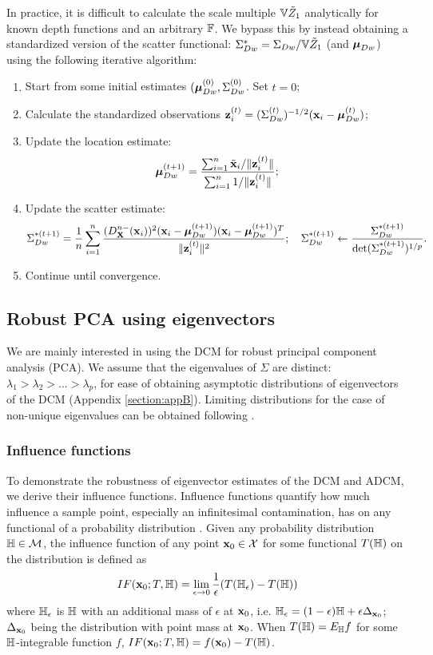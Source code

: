 In practice, it is difficult to calculate the scale multiple ${\mathbb{V}} \tilde Z_1$ analytically for known depth functions and an arbitrary ${\mathbb{F}}$. We bypass this by instead obtaining a standardized version of the scatter functional: $\Sigma_{Dw}^* = \Sigma_{Dw} / {\mathbb{V}} \tilde Z_1$ (and ${\boldsymbol{\mu}}_{Dw}$) using the following iterative algorithm:

\begin{enumerate}
\item Start from some initial estimates $({\boldsymbol{\mu}}_{Dw}^{(0)}, \Sigma_{Dw}^{(0)}$. Set $t=0$;

\item Calculate the standardized observations ${\bf{z}}_i^{(t)} = (\Sigma_{Dw}^{(t)})^{-1/2} ({\bf{x}}_i - {\boldsymbol{\mu}}_{Dw}^{(t)})$;

\item Update the location estimate:
%
$$
{\boldsymbol{\mu}}_{Dw}^{(t+1)} = \frac{\sum_{i=1}^n \tilde {{\bf{x}}}_i / \| {\bf{z}}_i^{(t)} \| }{\sum_{i=1}^n 1 / \| {\bf{z}}_i^{(t)} \|};
$$
%
\item Update the scatter estimate:
%
$$
\Sigma_{Dw}^{*(t+1)} = \frac{1}{n} \sum_{i=1}^n \frac{(D^{n-}_{\mathbf{X}} ({\bf{x}}_i))^2 ({\bf{x}}_i - {\boldsymbol{\mu}}_{Dw}^{(t+1)})({\bf{x}}_i - {\boldsymbol{\mu}}_{Dw}^{(t+1)})^T}{\| {\bf{z}}_i^{(t)} \|^2}; \quad \Sigma_{Dw}^{*(t+1)} \leftarrow \frac{\Sigma_{Dw}^{*(t+1)}}{\text{det} (\Sigma_{Dw}^{*(t+1)})^{1/p}}.
$$
%
\item Continue until convergence.
\end{enumerate}

\subsection{Robust PCA using eigenvectors}
\label{subsec:robustPCA}
We are mainly interested in using the DCM for robust principal component analysis (PCA). We assume that the eigenvalues of $\Sigma$ are distinct: $\lambda_1 > \lambda_2 > ... > \lambda_p$, for ease of obtaining asymptotic distributions of eigenvectors of the DCM (Appendix \ref{section:appB}). Limiting distributions for the case of non-unique eigenvalues can be obtained following \cite{magyar14}.

\subsubsection{Influence functions}
To demonstrate the robustness of eigenvector estimates of the DCM and ADCM, we derive their influence functions. Influence functions quantify how much influence a sample point, especially an infinitesimal contamination, has on any functional of a probability distribution \citep{HampelBook86}. Given any probability distribution ${\mathbb{H}} \in \mathcal{M}$, the influence function of any point ${\bf{x}}_0 \in \mathcal{X}$ for some functional $T({\mathbb{H}})$ on the distribution is defined as
%
$$
IF({\bf{x}}_0; T,{\mathbb{H}}) =
\lim_{\epsilon \rightarrow 0} \frac{1}{\epsilon} (T({\mathbb{H}}_\epsilon) - T({\mathbb{H}}))
$$
%
where ${\mathbb{H}}_\epsilon$ is ${\mathbb{H}}$ with an additional mass of $\epsilon$ at ${\bf{x}}_0$, i.e. ${\mathbb{H}}_\epsilon = (1-\epsilon){\mathbb{H}} + \epsilon \Delta_{{\bf{x}}_0}$; $\Delta_{{\bf{x}}_0}$ being the distribution with point mass at ${\bf{x}}_0$. When $T({\mathbb{H}}) = E_{\mathbb{H}} f$ for some ${\mathbb{H}}$-integrable function $f$, $IF({\bf{x}}_0; T,{\mathbb{H}}) = f({\bf{x}}_0) - T({\mathbb{H}})$.

